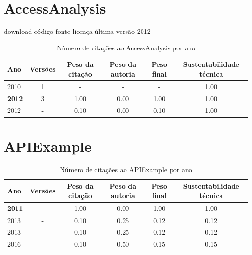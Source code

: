 \section{AccessAnalysis}
\checkmark download
\checkmark código fonte
\checkmark licença
\checkmark última versão 2012


\begin{table}[H]
\caption{Número de citações ao AccessAnalysis por ano}
\centering
\begin{tabular}{| l | c | c | c | c | c |}
  \hline
  Ano & Versões & Peso da citação & Peso da autoria & Peso final & Sustentabilidade técnica \\
  \hline
        2010 & 1 & - & - & -
        &
          {\color{blue} 1.00}
        \\
\hline
            {\bf 2012}
          &
          3
          &
          1.00
          &
          0.00
          &
          1.00
          &
            {\color{blue} 1.00}
          \\
            2012
          &
          -
          &
          0.10
          &
          0.00
          &
          0.10
          &
            {\color{blue} 1.00}
          \\
\hline
\end{tabular}
\end{table}



\section{APIExample}


\begin{table}[H]
\caption{Número de citações ao APIExample por ano}
\centering
\begin{tabular}{| l | c | c | c | c | c |}
  \hline
  Ano & Versões & Peso da citação & Peso da autoria & Peso final & Sustentabilidade técnica \\
  \hline
            {\bf 2011}
          &
          -
          &
          1.00
          &
          0.00
          &
          1.00
          &
            {\color{blue} 1.00}
          \\
\hline
            2013
          &
          -
          &
          0.10
          &
          0.25
          &
          0.12
          &
            {\color{red} 0.12}
          \\
            2013
          &
          -
          &
          0.10
          &
          0.25
          &
          0.12
          &
            {\color{red} 0.12}
          \\
\hline
            2016
          &
          -
          &
          0.10
          &
          0.50
          &
          0.15
          &
            {\color{red} 0.15}
          \\
\hline
\end{tabular}
\end{table}




